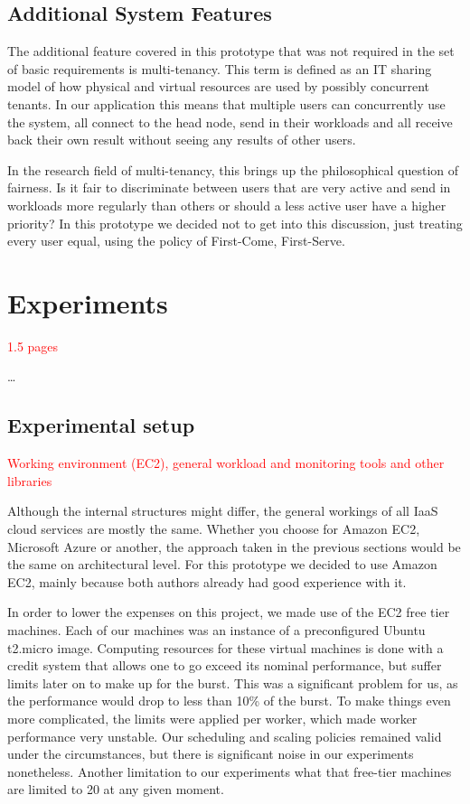\documentclass{stylesheet}
\begin{document}
\subsection{Additional System Features}
\label{subsec:additionalFeatures}
The additional feature covered in this prototype that was not required in the set of basic requirements is multi-tenancy. This term is defined as an IT sharing model of how physical and virtual resources are used by possibly concurrent tenants. In our application this means that multiple users can concurrently use the system, all connect to the head node, send in their workloads and all receive back their own result without seeing any results of other users.

In the research field of multi-tenancy, this brings up the philosophical question of fairness. Is it fair to discriminate between users that are very active and send in workloads more regularly than others or should a less active user have a higher priority? In this prototype we decided not to get into this discussion, just treating every user equal, using the policy of First-Come, First-Serve.

\section{Experiments}
\label{sec:experiments}
\textcolor{red}{1.5 pages}

\ldots

\subsection{Experimental setup}
\label{subsec:setup}
\textcolor{red}{Working environment (EC2), general workload and monitoring tools and other libraries}

Although the internal structures might differ, the general workings of all IaaS cloud services are mostly the same. Whether you choose for Amazon EC2, Microsoft Azure or another, the approach taken in the previous sections would be the same on architectural level. For this prototype we decided to use Amazon EC2, mainly because both authors already had good experience with it.

In order to lower the expenses on this project, we made use of the EC2 free tier machines. Each of our machines was an instance of a preconfigured Ubuntu t2.micro image. Computing resources for these virtual machines is done with a credit system that allows one to go exceed its nominal performance, but suffer limits later on to make up for the burst. This was a significant problem for us, as the performance would drop to less than 10\% of the burst. To make things even more complicated, the limits were applied per worker, which made worker performance very unstable. Our scheduling and scaling policies remained valid under the circumstances, but there is significant noise in our experiments nonetheless. Another limitation to our experiments what that free-tier machines are limited to 20 at any given moment.
\end{document}
